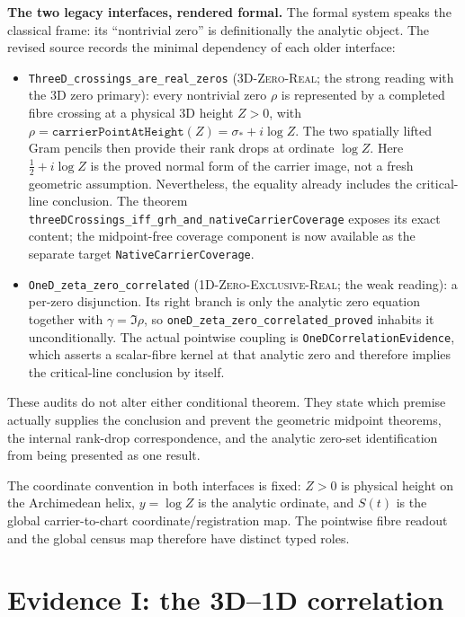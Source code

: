 \medskip
\noindent\textbf{The two legacy interfaces, rendered formal.} The formal
system speaks the classical frame: its ``nontrivial zero'' is definitionally
the analytic object.  The revised source records the minimal dependency of
each older interface:
\begin{itemize}
\item \texttt{ThreeD\_crossings\_are\_real\_zeros} (\textsc{3D-Zero-Real};
the strong reading with the 3D zero primary): every nontrivial zero \(\rho\)
is represented by a completed fibre crossing at a physical 3D height
\(Z>0\), with
\(\rho=\texttt{carrierPointAtHeight}(Z)=\sigma_*+i\log Z\). The two
spatially lifted Gram pencils then provide their rank drops at ordinate
\(\log Z\). Here \(\tfrac12+i\log Z\) is the proved normal form of the
carrier image, not a fresh
geometric assumption.  Nevertheless, the equality already includes the
critical-line conclusion.  The theorem
\texttt{threeDCrossings\_iff\_grh\_and\_nativeCarrierCoverage} exposes its
exact content; the midpoint-free coverage component is now available as the
separate target \texttt{NativeCarrierCoverage}.
\item \texttt{OneD\_zeta\_zero\_correlated} (\textsc{1D-Zero-Exclusive-Real};
the weak reading): a per-zero disjunction.  Its right branch is only the
analytic zero equation together with \(\gamma=\Im\rho\), so
\texttt{oneD\_zeta\_zero\_correlated\_proved} inhabits it unconditionally.
The actual pointwise coupling is \texttt{OneDCorrelationEvidence}, which
asserts a scalar-fibre kernel at that analytic zero and therefore implies the
critical-line conclusion by itself.
\end{itemize}
These audits do not alter either conditional theorem.  They state which
premise actually supplies the conclusion and prevent the geometric midpoint
theorems, the internal rank-drop correspondence, and the analytic zero-set
identification from being presented as one result.

The coordinate convention in both interfaces is fixed: $Z>0$ is physical
height on the Archimedean helix, $y=\log Z$ is the analytic ordinate, and
$S(t)$ is the global carrier-to-chart coordinate/registration map.  The
pointwise fibre readout and the global census map therefore have distinct
typed roles.

\section{Evidence I: the 3D--1D correlation}\label{sec:grh-E1}

